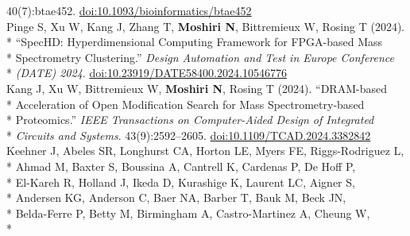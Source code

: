 \documentclass[margin,line]{res}
\begin{document}
\begin{resume}
\hspace*{8mm} 40(7):btae452. \href{https://doi.org/10.1093/bioinformatics/btae452}{doi:10.1093/bioinformatics/btae452}\\
\hspace*{4mm} Pinge S, Xu W, Kang J, Zhang T, \textbf{Moshiri N}, Bittremieux W, Rosing T (2024).\\*
\hspace*{9.5mm} ``SpecHD: Hyperdimensional Computing Framework for FPGA-based Mass\\*
\hspace*{9.5mm} Spectrometry Clustering.'' \textit{Design Automation and Test in Europe Conference}\\*\vspace{2mm}
\hspace*{8mm} \textit{(DATE) 2024}. \href{https://doi.org/10.23919/DATE58400.2024.10546776}{doi:10.23919/DATE58400.2024.10546776}\\
\hspace*{4mm} Kang J, Xu W, Bittremieux W, \textbf{Moshiri N}, Rosing T (2024). ``DRAM-based\\*
\hspace*{9.5mm} Acceleration of Open Modification Search for Mass Spectrometry-based\\*
\hspace*{9.5mm} Proteomics.'' \textit{IEEE Transactions on Computer-Aided Design of Integrated}\\*\vspace{2mm}
\hspace*{8mm} \textit{Circuits and Systems}. 43(9):2592--2605. \href{https://doi.org/10.1109/TCAD.2024.3382842}{doi:10.1109/TCAD.2024.3382842}\\
\hspace*{4mm} Keehner J, Abeles SR, Longhurst CA, Horton LE, Myers FE, Riggs-Rodriguez L,\\*
\hspace*{9.5mm} Ahmad M, Baxter S, Boussina A, Cantrell K, Cardenas P, De Hoff P,\\*
\hspace*{9.5mm} El-Kareh R, Holland J, Ikeda D, Kurashige K, Laurent LC, Aigner S,\\*
\hspace*{9.5mm} Andersen KG, Anderson C, Baer NA, Barber T, Bauk M, Beck JN,\\*
\hspace*{9.5mm} Belda-Ferre P, Betty M, Birmingham A, Castro-Martinez A, Cheung W,\\*

\end{resume}
\end{document}
